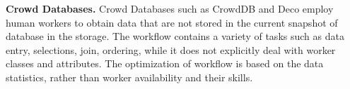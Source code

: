 \noindent
{\bf Crowd Databases.}
Crowd Databases such as CrowdDB\cite{FKK+11} and Deco\cite{PPG+12} employ human workers to obtain data that are not stored in the current snapshot of database in the  storage.
The workflow contains a variety of tasks such as data entry, selections, join, ordering, while it does not explicitly deal with worker classes and attributes. The optimization of workflow is based on the data statistics, rather than worker availability and their skills. 







